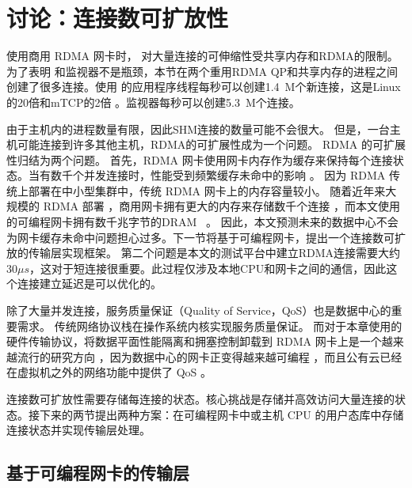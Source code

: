 \section{讨论：连接数可扩放性}
\label{socksdirect:sec:discussion}


使用商用 RDMA 网卡时，\sys {} 对大量连接的可伸缩性受共享内存和RDMA的限制。
为了表明 \libipc {} 和监视器不是瓶颈，本节在两个重用RDMA QP和共享内存的进程之间创建了很多连接。使用 \libipc {} 的应用程序线程每秒可以创建1.4~M个新连接，这是Linux的20倍和mTCP的2倍 \cite {jeong2014mtcp}。监视器每秒可以创建5.3~M个连接。

由于主机内的进程数量有限，因此SHM连接的数量可能不会很大。
但是，一台主机可能连接到许多其他主机，RDMA的可扩展性成为一个问题。
RDMA 的可扩展性归结为两个问题。
首先，RDMA 网卡使用网卡内存作为缓存来保持每个连接状态。当有数千个并发连接时，性能受到频繁缓存未命中的影响 \cite {mprdma,kaminsky2016design,kalia2018datacenter}。
因为 RDMA 传统上部署在中小型集群中，传统 RDMA 网卡上的内存容量较小。
随着近年来大规模的 RDMA 部署 \cite {guo2016rdma}，商用网卡拥有更大的内存来存储数千个连接 \cite {kalia2018datacenter}，而本文使用的可编程网卡拥有数千兆字节的DRAM~ \cite {mellanox-innova,mellanox-bluefield,smartnic}。
因此，本文预测未来的数据中心不会为网卡缓存未命中问题担心过多。下一节将基于可编程网卡，提出一个连接数可扩放的传输层实现框架。
第二个问题是本文的测试平台中建立RDMA连接需要大约 $30 \mu s$，这对于短连接很重要。此过程仅涉及本地CPU和网卡之间的通信，因此这个连接建立延迟是可以优化的。

除了大量并发连接，服务质量保证（Quality of Service，QoS）也是数据中心的重要需求。
传统网络协议栈在操作系统内核实现服务质量保证。
而对于本章使用的硬件传输协议，将数据平面性能隔离和拥塞控制卸载到 RDMA 网卡上是一个越来越流行的研究方向 \cite {peter2016arrakis,zhu2015congestion,lu2017memory,mprdma,mittal2018revisiting}，因为数据中心的网卡正变得越来越可编程  \cite{smartnic,cavium,kaufmann2015flexnic,mellanox-innova,mellanox-bluefield}，而且公有云已经在虚拟机之外的网络功能中提供了 QoS \cite {li2016clicknp,panda2016netbricks,floem-osdi18}。

连接数可扩放性需要存储每连接的状态。核心挑战是存储并高效访问大量连接的状态。接下来的两节提出两种方案：在可编程网卡中或主机 CPU 的用户态库中存储连接状态并实现传输层处理。

\subsection{基于可编程网卡的传输层}
\label{socksdirect:sec:smartnic}

